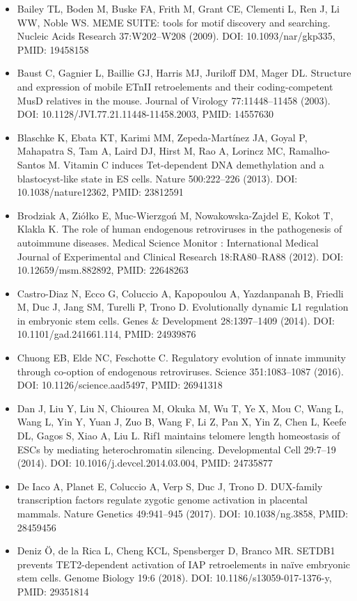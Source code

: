 \documentclass[11pt,a4paper]{article}
\begin{document}
\begin{itemize}
\item Bailey TL, Boden M, Buske FA, Frith M, Grant CE, Clementi L, Ren J, Li WW, Noble WS. MEME SUITE: tools for motif discovery and searching. Nucleic Acids Research 37:W202–W208 (2009). DOI: 10.1093/nar/gkp335, PMID: 19458158
\item Baust C, Gagnier L, Baillie GJ, Harris MJ, Juriloff DM, Mager DL. Structure and expression of mobile ETnII retroelements and their coding-competent MusD relatives in the mouse. Journal of Virology 77:11448–11458 (2003). DOI: 10.1128/JVI.77.21.11448-11458.2003, PMID: 14557630
\item Blaschke K, Ebata KT, Karimi MM, Zepeda-Martínez JA, Goyal P, Mahapatra S, Tam A, Laird DJ, Hirst M, Rao A, Lorincz MC, Ramalho-Santos M. Vitamin C induces Tet-dependent DNA demethylation and a blastocyst-like state in ES cells. Nature 500:222–226 (2013). DOI: 10.1038/nature12362, PMID: 23812591
\item Brodziak A, Ziółko E, Muc-Wierzgoń M, Nowakowska-Zajdel E, Kokot T, Klakla K. The role of human endogenous retroviruses in the pathogenesis of autoimmune diseases. Medical Science Monitor : International Medical Journal of Experimental and Clinical Research 18:RA80–RA88 (2012). DOI: 10.12659/msm.882892, PMID: 22648263
\item Castro-Diaz N, Ecco G, Coluccio A, Kapopoulou A, Yazdanpanah B, Friedli M, Duc J, Jang SM, Turelli P, Trono D. Evolutionally dynamic L1 regulation in embryonic stem cells. Genes \& Development 28:1397–1409 (2014). DOI: 10.1101/gad.241661.114, PMID: 24939876
\item Chuong EB, Elde NC, Feschotte C. Regulatory evolution of innate immunity through co-option of endogenous retroviruses. Science 351:1083–1087 (2016). DOI: 10.1126/science.aad5497, PMID: 26941318
\item Dan J, Liu Y, Liu N, Chiourea M, Okuka M, Wu T, Ye X, Mou C, Wang L, Wang L, Yin Y, Yuan J, Zuo B, Wang F, Li Z, Pan X, Yin Z, Chen L, Keefe DL, Gagos S, Xiao A, Liu L. Rif1 maintains telomere length homeostasis of ESCs by mediating heterochromatin silencing. Developmental Cell 29:7–19 (2014). DOI: 10.1016/j.devcel.2014.03.004, PMID: 24735877
\item De Iaco A, Planet E, Coluccio A, Verp S, Duc J, Trono D. DUX-family transcription factors regulate zygotic genome activation in placental mammals. Nature Genetics 49:941–945 (2017). DOI: 10.1038/ng.3858, PMID: 28459456
\item Deniz Ö, de la Rica L, Cheng KCL, Spensberger D, Branco MR. SETDB1 prevents TET2-dependent activation of IAP retroelements in naïve embryonic stem cells. Genome Biology 19:6 (2018). DOI: 10.1186/s13059-017-1376-y, PMID: 29351814

\end{itemize}
\end{document}
